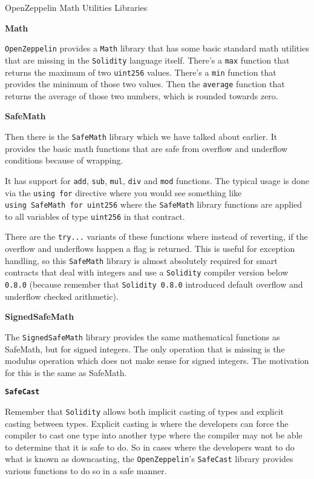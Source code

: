 OpenZeppelin Math Utilities Libraries

\textbf{Math}

\texttt{OpenZeppelin} provides a \texttt{Math} library that has some
basic standard math utilities that are missing in the \texttt{Solidity}
language itself. There's a \texttt{max} function that returns the
maximum of two \texttt{uint256} values. There's a \texttt{min} function
that provides the minimum of those two values. Then the \texttt{average}
function that returns the average of those two numbers, which is rounded
towards zero.

\textbf{SafeMath}

Then there is the \texttt{SafeMath} library which we have talked about
earlier. It provides the basic math functions that are safe from
overflow and underflow conditions because of wrapping.

It has support for \texttt{add}, \texttt{sub}, \texttt{mul},
\texttt{div} and \texttt{mod} functions. The typical usage is done via
the \texttt{using\ for} directive where you would see something like
\texttt{using\ SafeMath\ for\ uint256} where the \texttt{SafeMath}
library functions are applied to all variables of type \texttt{uint256}
in that contract.

There are the \texttt{try...} variants of these functions where instead
of reverting, if the overflow and underflows happen a flag is returned.
This is useful for exception handling, so this \texttt{SafeMath} library
is almost absolutely required for smart contracts that deal with
integers and use a \texttt{Solidity} compiler version below
\texttt{0.8.0} (because remember that \texttt{Solidity\ 0.8.0}
introduced default overflow and underflow checked arithmetic).

\textbf{SignedSafeMath}

The \texttt{SignedSafeMath} library provides the same mathematical
functions as SafeMath, but for signed integers. The only operation that
is missing is the modulus operation which does not make sense for signed
integers. The motivation for this is the same as SafeMath.

\textbf{\texttt{SafeCast}}

Remember that \texttt{Solidity} allows both implicit casting of types
and explicit casting between types. Explicit casting is where the
developers can force the compiler to cast one type into another type
where the compiler may not be able to determine that it is safe to do.
So in cases where the developers want to do what is known as
downcasting, the \texttt{OpenZeppelin}'s \texttt{SafeCast} library
provides various functions to do so in a safe manner.

